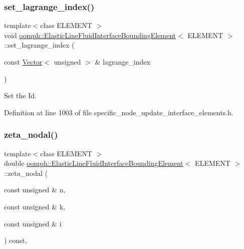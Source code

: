 \subsubsection{\texorpdfstring{set\+\_\+lagrange\+\_\+index()}{set\_lagrange\_index()}}
{\footnotesize\ttfamily template$<$class E\+L\+E\+M\+E\+NT $>$ \\
void \hyperlink{classoomph_1_1ElasticLineFluidInterfaceBoundingElement}{oomph\+::\+Elastic\+Line\+Fluid\+Interface\+Bounding\+Element}$<$ E\+L\+E\+M\+E\+NT $>$\+::set\+\_\+lagrange\+\_\+index (\begin{DoxyParamCaption}\item[{const \hyperlink{classoomph_1_1Vector}{Vector}$<$ unsigned $>$ \&}]{lagrange\+\_\+index }\end{DoxyParamCaption})\hspace{0.3cm}{\ttfamily [inline]}}



Set the Id. 



Definition at line 1003 of file specific\+\_\+node\+\_\+update\+\_\+interface\+\_\+elements.\+h.

\mbox{\label{classoomph_1_1ElasticLineFluidInterfaceBoundingElement_a1d8a7213d7bd2826bc59af770f66f402}} 
\subsubsection{\texorpdfstring{zeta\+\_\+nodal()}{zeta\_nodal()}}
{\footnotesize\ttfamily template$<$class E\+L\+E\+M\+E\+NT $>$ \\
double \hyperlink{classoomph_1_1ElasticLineFluidInterfaceBoundingElement}{oomph\+::\+Elastic\+Line\+Fluid\+Interface\+Bounding\+Element}$<$ E\+L\+E\+M\+E\+NT $>$\+::zeta\+\_\+nodal (\begin{DoxyParamCaption}\item[{const unsigned \&}]{n,  }\item[{const unsigned \&}]{k,  }\item[{const unsigned \&}]{i }\end{DoxyParamCaption}) const\hspace{0.3cm}{\ttfamily [inline]}, {\ttfamily [virtual]}}




